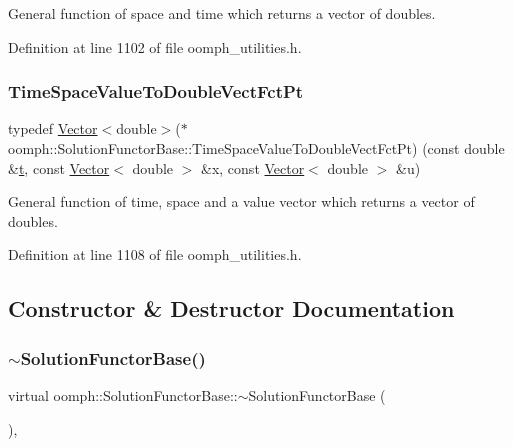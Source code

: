 General function of space and time which returns a vector of doubles. 



Definition at line 1102 of file oomph\+\_\+utilities.\+h.

\mbox{\label{classoomph_1_1SolutionFunctorBase_aca237d543e590a388b771aea22d3aad6}} 
\subsubsection{\texorpdfstring{Time\+Space\+Value\+To\+Double\+Vect\+Fct\+Pt}{TimeSpaceValueToDoubleVectFctPt}}
{\footnotesize\ttfamily typedef \hyperlink{classoomph_1_1Vector}{Vector}$<$double$>$($\ast$ oomph\+::\+Solution\+Functor\+Base\+::\+Time\+Space\+Value\+To\+Double\+Vect\+Fct\+Pt) (const double \&\hyperlink{cfortran_8h_af6f0bd3dc13317f895c91323c25c2b8f}{t}, const \hyperlink{classoomph_1_1Vector}{Vector}$<$ double $>$ \&x, const \hyperlink{classoomph_1_1Vector}{Vector}$<$ double $>$ \&u)}

General function of time, space and a value vector which returns a vector of doubles. 

Definition at line 1108 of file oomph\+\_\+utilities.\+h.



\subsection{Constructor \& Destructor Documentation}
\mbox{\label{classoomph_1_1SolutionFunctorBase_a6c5ad348f7c2fa03ae7e9eaa845c6481}} 
\subsubsection{\texorpdfstring{$\sim$\+Solution\+Functor\+Base()}{~SolutionFunctorBase()}}
{\footnotesize\ttfamily virtual oomph\+::\+Solution\+Functor\+Base\+::$\sim$\+Solution\+Functor\+Base (\begin{DoxyParamCaption}{ }\end{DoxyParamCaption})\hspace{0.3cm}{\ttfamily [inline]}, {\ttfamily [virtual]}}



